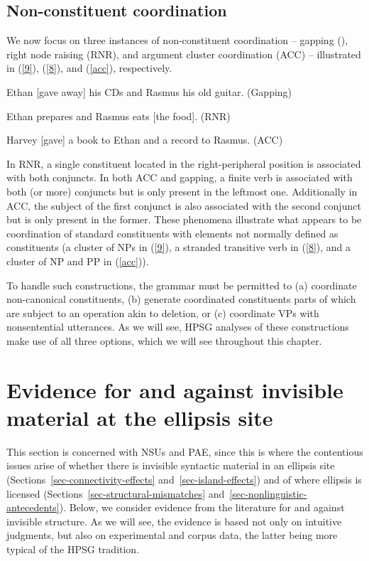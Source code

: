 \subsection{Non-constituent coordination}

We now focus on three instances of non-constituent coordination -- gapping (\citealt{Ross1967}), right node raising (RNR), and argument cluster coordination (ACC) -- illustrated in (\ref{9}), (\ref{8}), and (\ref{acc}), respectively.

 \ea Ethan [gave away] his CDs and Rasmus his old guitar. (Gapping)\label{9}\z

 \ea %
 Ethan prepares and Rasmus eats [the food]. (RNR)
 \label{8}\z

\ea Harvey [gave] a book to Ethan and a record to Rasmus. (ACC) \label{acc}\z

In RNR, a single constituent located in the right-peripheral position is associated with both conjuncts. In both ACC and gapping, a finite verb is associated with both (or more) conjuncts but is only present in the leftmost one. Additionally in ACC, the subject of the first conjunct is also associated with the second conjunct but is only present in the former. These phenomena illustrate what appears to be coordination of standard constituents with elements not normally defined as constituents (a cluster of NPs in (\ref{9}), a stranded transitive verb in (\ref{8}), and a cluster of NP and PP in (\ref{acc})).
%

 To handle such constructions, the grammar must be permitted to (a) coordinate non-canonical constituents, (b) generate coordinated constituents parts of which are subject to an operation akin to deletion, or (c) coordinate VPs with nonsentential utterances. As we will see, HPSG analyses of these constructions make use of all three options, which we will see throughout this chapter.

\section{Evidence for and against invisible material at the ellipsis site}
\label{sec-evidence-for-invisible-material}

This section is concerned with NSUs and PAE, since this is where the contentious issues arise of
 whether there is invisible syntactic material in an ellipsis site (Sections~\ref{sec-connectivity-effects} and~\ref{sec-island-effects}) and of where ellipsis is licensed (Sections~\ref{sec-structural-mismatches} and~\ref{sec-nonlinguistic-antecedents}).  Below, we consider evidence from the literature for and against invisible structure. As we will see, the evidence is based not only on intuitive judgments, but also on experimental and corpus data, the latter being more typical of the HPSG tradition.


